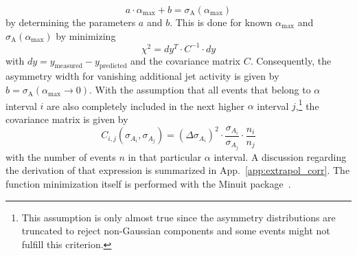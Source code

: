 \begin{equation}
 a \cdot \alpha_\mathrm{max} + b = \sigma_\mathrm{A}(\alpha_\mathrm{max})
\end{equation}
by determining the parameters $a$ and $b$. This is done for known $\alpha_\mathrm{max}$ and $\sigma_\mathrm{A}(\alpha_\mathrm{max})$ by minimizing 
\begin{equation}
\chi^2 = dy^T \cdot C^{-1} \cdot dy
\end{equation}
with $dy = y_{\mathrm{measured}} - y_{\mathrm{predicted}}$ and the covariance matrix $C$. Consequently, the asymmetry width for vanishing additional jet activity is given by $b=\sigma_\mathrm{A}(\alpha_\mathrm{max} \rightarrow 0)$. With the assumption that all events that belong to $\alpha$ interval $i$ are also completely included in the next higher $\alpha$ interval $j$,\footnote{This assumption is only almost true since the asymmetry distributions are truncated to reject non-Gaussian components and some events might not fulfill this criterion.} the covariance matrix is given by
\begin{equation}
C_{i,j}(\sigma_{A_i},\sigma_{A_j}) = (\Delta \sigma_{A_i})^2 \cdot \frac{\sigma_{A_i}}{\sigma_{A_j}} \cdot \frac{n_i}{n_j} 
\label{eq:jer_corr}
\end{equation}
with the number of events $n$ in that particular $\alpha$ interval. A discussion regarding the derivation of that expression is summarized in App.~\ref{app:extrapol_corr}. The function minimization itself is performed with the Minuit package~\cite{Minuit}.   
